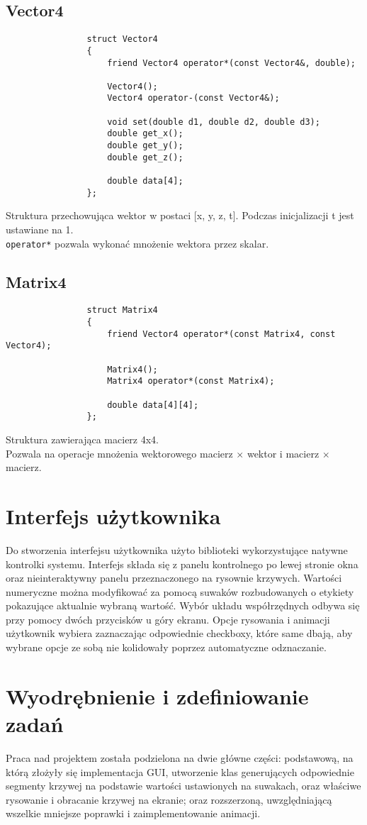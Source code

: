 		\subsection{Vector4}
			\begin{lstlisting}
				struct Vector4
				{
				    friend Vector4 operator*(const Vector4&, double);
				
				    Vector4();
				    Vector4 operator-(const Vector4&);
				
				    void set(double d1, double d2, double d3);
				    double get_x();
				    double get_y();
				    double get_z();
				
				    double data[4];
				};
			\end{lstlisting}
			Struktura przechowująca wektor w postaci [x, y, z, t]. Podczas inicjalizacji t jest ustawiane na 1.\\
			\lstinline|operator*| pozwala wykonać mnożenie wektora przez skalar.
		\subsection{Matrix4}
			\begin{lstlisting}
				struct Matrix4
				{
				    friend Vector4 operator*(const Matrix4, const Vector4);
				
				    Matrix4();
				    Matrix4 operator*(const Matrix4);
				
				    double data[4][4];
				};
			\end{lstlisting}
			Struktura zawierająca macierz 4x4.\\
			Pozwala na operacje mnożenia wektorowego macierz $\times$ wektor i macierz $\times$ macierz.

\section{Interfejs użytkownika}
Do stworzenia interfejsu użytkownika użyto biblioteki wykorzystujące natywne kontrolki systemu. Interfejs składa się z panelu kontrolnego po lewej stronie okna oraz nieinteraktywny panelu przeznaczonego na rysownie krzywych. Wartości numeryczne można modyfikować za pomocą suwaków rozbudowanych o etykiety pokazujące aktualnie wybraną wartość. Wybór układu współrzędnych odbywa się przy pomocy dwóch przycisków u góry ekranu. Opcje rysowania i animacji użytkownik wybiera zaznaczając odpowiednie checkboxy, które same dbają, aby wybrane opcje ze sobą nie kolidowały poprzez automatyczne odznaczanie. 
\section{Wyodrębnienie i zdefiniowanie zadań}
Praca nad projektem została podzielona na dwie główne części: podstawową, na którą złożyły się implementacja GUI, utworzenie klas generujących odpowiednie segmenty krzywej na podstawie wartości ustawionych na suwakach, oraz właściwe rysowanie i obracanie krzywej na ekranie; oraz rozszerzoną, uwzględniającą wszelkie mniejsze poprawki i zaimplementowanie animacji.

